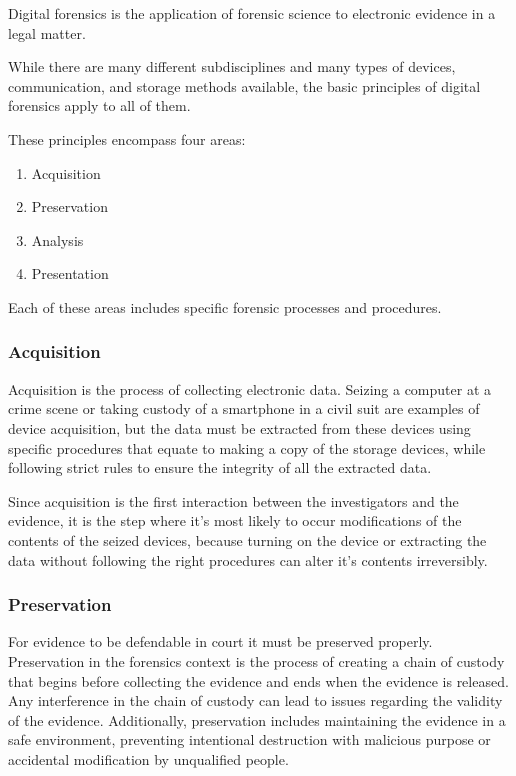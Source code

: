 Digital forensics is the application of forensic science to electronic evidence in a
legal matter.

While there are many different subdisciplines and many types of devices, communication,
and storage methods available, the basic principles of digital forensics
apply to all of them.

These principles encompass four areas:

\begin{enumerate}
\item Acquisition
\item Preservation
\item Analysis
\item Presentation
\end{enumerate}

Each of these areas includes specific forensic processes and procedures.

\subsubsection*{Acquisition}

Acquisition is the process of collecting electronic data. Seizing a computer at a crime scene or
taking custody of a smartphone in a civil suit are examples of device acquisition, but the data 
must be extracted from these devices using specific procedures that equate to making a copy of
the storage devices, while following strict rules to ensure the integrity of all the extracted data.

Since acquisition is the first interaction between the investigators and the evidence,
it is the step where it's most likely to occur modifications of the contents of the seized devices,
because turning on the device or extracting the data without following the right procedures can alter
it's contents irreversibly.

\subsubsection*{Preservation}

For evidence to be defendable in court it must be preserved properly.
Preservation in the forensics context is the process of creating a chain of custody
that begins before collecting the evidence and ends when the evidence is released.
Any interference in the chain of custody can lead to issues regarding the validity of the evidence.
Additionally, preservation includes maintaining the evidence in a safe environment, preventing
intentional destruction with malicious purpose or accidental modification by unqualified people.

